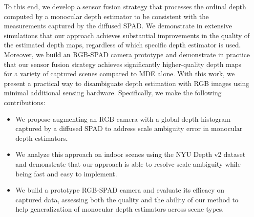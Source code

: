 
To this end, we develop a sensor fusion strategy that processes the ordinal
depth computed by a monocular depth estimator to be consistent with the
measurements captured by the diffused SPAD. We demonstrate in extensive
simulations that our approach achieves substantial improvements in the quality
of the estimated depth maps, regardless of which specific depth estimator is
used. Moreover, we build an RGB-SPAD camera prototype and demonstrate in
practice that our sensor fusion strategy achieves significantly higher-quality
depth maps for a variety of captured scenes compared to MDE alone. With this
work, we present a practical way to disambiguate depth estimation with RGB
images using minimal additional sensing hardware. Specifically, we make the
following contributions:

%
\begin{itemize}
	\item We propose augmenting an RGB camera with a global depth histogram captured by a diffused SPAD to address scale ambiguity error in monocular depth estimators.	
  \item We analyze this approach on indoor scenes using the NYU Depth v2 dataset and demonstrate that our approach is able to resolve scale ambiguity while being fast and easy to implement.
	\item We build a prototype RGB-SPAD camera and evaluate its efficacy on captured data, assessing both the quality and the ability of our method to help generalization of monocular depth estimators across scene types. 
\end{itemize}


